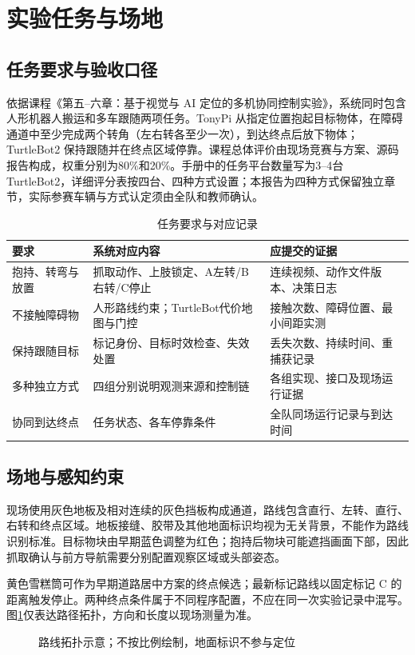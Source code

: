 \section{实验任务与场地}
\subsection{任务要求与验收口径}
依据课程《第五--六章：基于视觉与 AI 定位的多机协同控制实验》\cite{course}，系统同时包含人形机器人搬运和多车跟随两项任务。TonyPi 从指定位置抱起目标物体，在障碍通道中至少完成两个转角（左右转各至少一次），到达终点后放下物体；TurtleBot2 保持跟随并在终点区域停靠。课程总体评价由现场竞赛与方案、源码报告构成，权重分别为80\%和20\%。手册中的任务平台数量写为3--4台 TurtleBot2，详细评分表按四台、四种方式设置；本报告为四种方式保留独立章节，实际参赛车辆与方式认定须由全队和教师确认。

\begin{table}[htbp]\centering\small
\caption{任务要求与对应记录}
\begin{tabularx}{\linewidth}{p{30mm}YY}\toprule
要求 & 系统对应内容 & 应提交的证据\\\midrule
抱持、转弯与放置 & 抓取动作、上肢锁定、A左转/B右转/C停止 & 连续视频、动作文件版本、决策日志\\
不接触障碍物 & 人形路线约束；TurtleBot代价地图与门控 & 接触次数、障碍位置、最小间距实测\\
保持跟随目标 & 标记身份、目标时效检查、失效处置 & 丢失次数、持续时间、重捕获记录\\
多种独立方式 & 四组分别说明观测来源和控制链 & 各组实现、接口及现场运行证据\\
协同到达终点 & 任务状态、各车停靠条件 & 全队同场运行记录与到达时间\\\bottomrule
\end{tabularx}\end{table}

\subsection{场地与感知约束}
现场使用灰色地板及相对连续的灰色挡板构成通道，路线包含直行、左转、直行、右转和终点区域。地板接缝、胶带及其他地面标识均视为无关背景，不能作为路线识别标准。目标物块由早期蓝色调整为红色；抱持后物块可能遮挡画面下部，因此抓取确认与前方导航需要分别配置观察区域或头部姿态。

黄色雪糕筒可作为早期道路居中方案的终点候选；最新标记路线以固定标记 C 的距离触发停止。两种终点条件属于不同程序配置，不应在同一次实验记录中混写。图\ref{fig:route}仅表达路径拓扑，方向和长度以现场测量为准。
\begin{figure}[htbp]\centering

\caption{路线拓扑示意；不按比例绘制，地面标识不参与定位}\label{fig:route}
\end{figure}
